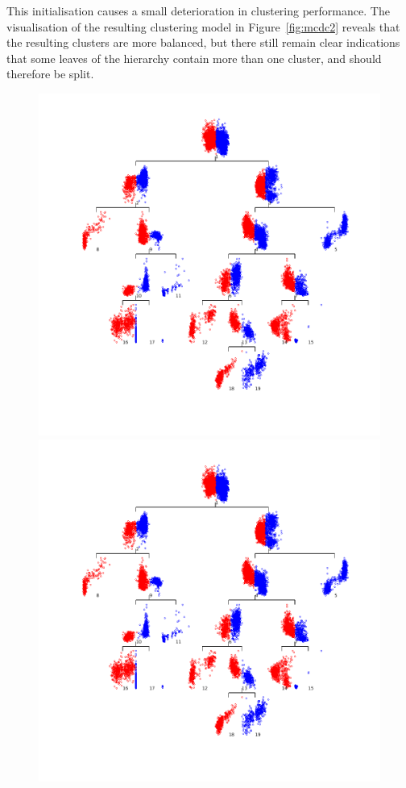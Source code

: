 \documentclass{book}
\begin{document}
\noindent
%
This initialisation causes a small deterioration in clustering performance. The visualisation
of the resulting clustering model in Figure~\ref{fig:mcdc2} reveals that the
resulting clusters are more balanced, but there still remain clear indications that some leaves of the
hierarchy contain more than one cluster, and should therefore be split.
%
\begin{figure}
%
\begin{latexonly}
%
\begin{center}
\includegraphics[scale=0.3]{figures/mcdc3.png}
\end{center}
%
%
\end{latexonly}
%
\begin{htmlonly}
%
\includegraphics[scale=0.7]{figures/mcdc3.png}

\end{htmlonly}
\end{figure}
\end{document}
